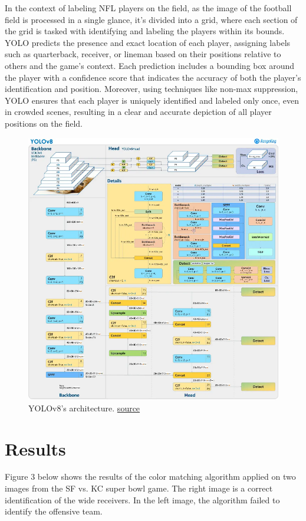In the context of labeling NFL players on the field, as the image of the football field is processed in a single glance, it's divided into a grid, where each section of the grid is tasked with identifying and labeling the players within its bounds. YOLO predicts the presence and exact location of each player, assigning labels such as quarterback, receiver, or lineman based on their positions relative to others and the game's context. Each prediction includes a bounding box around the player with a confidence score that indicates the accuracy of both the player's identification and position. Moreover, using techniques like non-max suppression, YOLO ensures that each player is uniquely identified and labeled only once, even in crowded scenes, resulting in a clear and accurate depiction of all player positions on the field. 
\begin{figure}[t]
    \centering
    \includegraphics[width=0.8\linewidth]{architecture.png}
    \caption{YOLOv8's architecture. \href{https://blog.roboflow.com/whats-new-in-yolov8/}{source}}
    \label{fig:architecture}
\end{figure}

\section{Results}

Figure 3 below shows the results of the color matching algorithm applied on two images from the SF vs. KC super bowl game. The right image is a correct identification of the wide receivers. In the left image, the algorithm failed to identify the offensive team.

